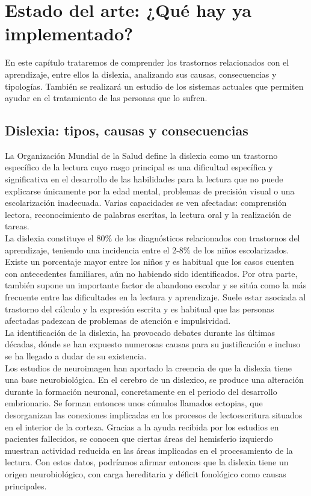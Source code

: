 \chapter{Estado del arte: ¿Qué hay ya implementado?}
En este capítulo trataremos de comprender los trastornos relacionados con el aprendizaje, entre ellos la dislexia, analizando sus causas, consecuencias y tipologías. También se realizará un estudio de los sistemas actuales que permiten ayudar en el tratamiento de las personas que lo sufren.

\section{Dislexia: tipos, causas y consecuencias}
La Organización Mundial de la Salud define la dislexia como un trastorno específico de la lectura cuyo rasgo principal es una dificultad específica y significativa en el desarrollo de las habilidades para la lectura que no puede explicarse únicamente por la edad mental, problemas de precisión visual o una escolarización inadecuada. Varias capacidades se ven afectadas: comprensión lectora, reconocimiento de palabras escrítas, la lectura oral y la realización de tareas.
\\

La dislexia \cite{Asandis} constituye el 80\% de los diagnósticos relacionados con trastornos del aprendizaje, teniendo una incidencia entre el 2-8\% de los niños escolarizados. Existe un porcentaje mayor entre los niños y es habitual que los casos cuenten con antecedentes familiares, aún no habiendo sido identificados. Por otra parte, también supone un importante factor de abandono escolar y se sitúa como la más frecuente entre las dificultades en la lectura y aprendizaje. Suele estar asociada al trastorno del cálculo y la expresión escrita y es habitual que las personas afectadas padezcan de problemas de atención e impulsividad.
\\

La identificación de la dislexia, ha provocado debates durante las últimas décadas, dónde se han expuesto numerosas causas para su justificación e incluso se ha llegado a dudar de su existencia.
\\

Los estudios de neuroimagen \cite{LaDislexia} han aportado la creencia de que la dislexia tiene una base neurobiológica. En el cerebro de un dislexico, se produce una alteración durante la formación neuronal, concretamente en el periodo del desarrollo embrionario. Se forman entonces unos cúmulos llamados ectopias, que desorganizan las conexiones implicadas en los procesos de lectoescritura situados en el interior de la corteza. Gracias a la ayuda recibida por los estudios en pacientes fallecidos, se conocen que ciertas áreas del hemisferio izquierdo muestran actividad reducida en las áreas implicadas en el procesamiento de la lectura. Con estos datos, podríamos afirmar entonces que la dislexia tiene un origen neurobiológico, con carga hereditaria y déficit fonológico como causas principales.
\\

